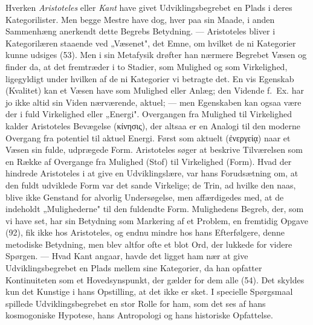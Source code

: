 \documentclass[12pt,a4paper]{book}
\newcommand{\apage}[1]{\marginnote{\footnotesize\textit{[#1]}}}
\begin{document}
Hverken \emph{Aristoteles} eller \emph{Kant} have givet Udviklingsbegrebet en Plads
i deres Kategorilister. Men begge Mestre have dog, hver paa sin Maade, i anden
Sammenhæng anerkendt dette Begrebs Betydning. --- Aristoteles bliver i
Kategorilæren staaende ved „Væsenet", det Emne, om hvilket de ni Kategorier kunne
udsiges (53). Men i sin Metafysik drøfter han nærmere Begrebet Væsen og finder da,
at det fremtræder i to Stadier, som Mulighed og som Virkelighed, ligegyldigt under
hvilken af de ni Kategorier vi betragte det. En vis Egenskab (Kvalitet) kan
et Væsen have som Mulighed eller Anlæg; den Vidende f.\ Ex. har jo ikke altid sin
Viden nærværende, aktuel; --- men Egenskaben kan ogsaa være der i fuld Virkelighed
eller „Energi". Overgangen fra Mulighed til Virkelighed kalder Aristoteles Bevægelse
(κίνησις), der altsaa er en Analogi til den moderne Overgang \apage{229} fra potentiel til
aktuel Energi. Først som aktuelt (ἐνεργείᾳ) naar et Væsen sin fulde, udprægede Form.
Aristoteles søger at beskrive Tilværelsen som en Række af Overgange fra Mulighed
(Stof) til Virkelighed (Form). Hvad der hindrede Aristoteles i at give en
Udviklingslære, var hans Forudsætning om, at den fuldt udviklede Form var det sande
Virkelige; de Trin, ad hvilke den naas, blive ikke Genstand for alvorlig
Undersøgelse, men affærdigedes med, at de indeholdt „Mulighederne" til den fuldendte
Form. Mulighedens Begreb, der, som vi have set, har sin Betydning som Markering af
et Problem, en fremtidig Opgave (92), fik ikke hos Aristoteles, og endnu mindre hos
hans Efterfølgere, denne metodiske Betydning, men blev altfor ofte et blot Ord, der
lukkede for videre Spørgen. --- Hvad Kant angaar, havde det ligget ham nær at give
Udviklingsbegrebet en Plads mellem sine Kategorier, da han opfatter Kontinuiteten
som et Hovedsynspunkt, der gælder for dem alle (54). Det skyldes kun det Kunstige i
hans Opstilling, at det ikke er sket. I specielle Spørgsmaal spillede
Udviklingsbegrebet en stor Rolle for ham, som det ses af hans kosmogoniske
Hypotese, hans Antropologi og hans historiske Opfattelse.
\end{document}
